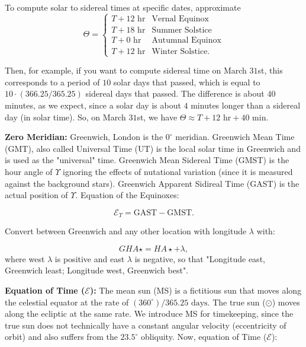 \documentclass[12pt]{article}
\newcommand{\V}{

\vspace{\baselineskip}

}
\begin{document}
To compute solar to sidereal times at specific dates, approximate 
\[
\Theta = \begin{cases}
    T + 12\text{ hr} & \text{Vernal Equinox} \\
    T + 18\text{ hr} & \text{Summer Solstice} \\
    T + 0\text{ hr} & \text{Autumnal Equinox} \\
    T + 12\text{ hr} & \text{Winter Solstice}. 
\end{cases}
\]

Then, for example, if you want to compute sidereal time on March $31$st, this corresponds to a period of $10$ solar days that passed, which is equal to $10\cdot (366.25/365.25)$ sidereal days that passed. The difference is about $40$ minutes, as we expect, since a solar day is about $4$ minutes longer than a sidereal day (in solar time). So, on March $31$st, we have $\Theta \approx T + 12\text{ hr} + 40\text{ min}$.\V

\textbf{Zero Meridian:} Greenwich, London is the $0^{\circ}$ meridian. Greenwich Mean Time (GMT), also called Universal Time (UT) is the local solar time in Greenwich and is used as the "universal" time. Greenwich Mean Sidereal Time (GMST) is the hour angle of $\Upsilon$ ignoring the effects of nutational variation (since it is measured against the background stars). Greenwich Apparent Sidireal Time (GAST) is the actual position of $\Upsilon$. Equation of the Equinoxes: 

\begin{equation*}
    \mathcal{E}_{\Upsilon} = \text{GAST} - \text{GMST}.
\end{equation*}

Convert between Greenwich and any other location with longitude $\lambda$ with: 

\begin{equation*}
    GHA\star = HA\star + \lambda,
\end{equation*}
where west $\lambda$ is positive and east $\lambda$ is negative, so that "Longitude east, Greenwich least; Longitude west, Greenwich best".\V

\textbf{Equation of Time ($\mathcal{E}$):} The mean sun (MS) is a fictitious sun that moves along the celestial equator at the rate of $(360^{\circ})/365.25\text{ days}$. The true sun ($\odot$) moves along the ecliptic at the same rate. We introduce MS for timekeeping, since the true sun does not technically have a constant angular velocity (eccentricity of orbit) and also suffers from the $23.5^{\circ}$ obliquity. Now, equation of Time ($\mathcal{E}$):
\end{document}
